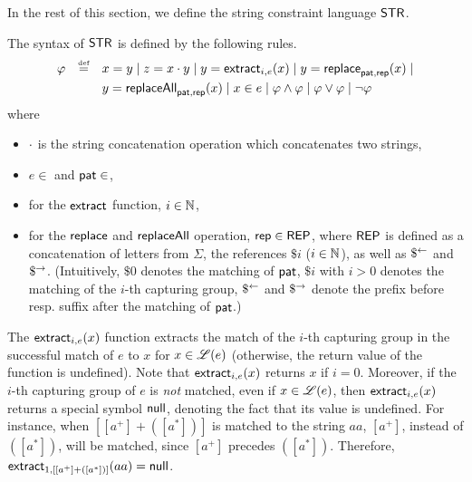 
In the rest of this section, we define the string constraint language $\mathsf{STR}$. 

The syntax of $\mathsf{STR}$ is defined by the following rules.
\[
\begin{array}{l c l}
\smallskip
\varphi & \eqdef  & x = y \mid z = x \concat y \mid y  = \extract_{i, e}(x) \mid
y  = \replace_{\pat, \rep}(x) \mid 
\\
& & y = \replaceall_{\pat, \rep}(x)   \mid
 x \in e \mid  \varphi \wedge \varphi \mid \varphi \vee \varphi \mid \neg \varphi \
\label{eq:SL}
\end{array}
\]
where
\begin{itemize}
	\item $\cdot$ is the string concatenation operation which concatenates two strings,
%
\item  $e \in${\regexp} and $\mathsf{pat} \in${\regexp},
%
\item for the $\mathsf{extract}$ function, $i \in \mathbb{N}$,
%
	\item  for the $\mathsf{replace}$ and $\mathsf{replaceAll}$ operation, $\mathsf{rep} \in {\sf REP}$, where ${\sf REP}$ is defined as a concatenation of letters from $\Sigma$, the references $\$i$ ($i \in \mathbb{N}$), as well as $\$^{\leftarrow}$ and $\$^{\rightarrow}$. (Intuitively, $\$0$ denotes the matching of $\mathsf{pat}$, $\$i$ with $i > 0$ denotes the matching of the $i$-th capturing group, $\$^{\leftarrow}$ and $\$^{\rightarrow}$ denote the prefix before resp. suffix after the matching of $\mathsf{pat}$.)
%
\end{itemize}

The $\mathsf{extract}_{i, e}(x)$ function extracts the match of the $i$-th capturing group in the successful match of $e$ to $x$ for $x \in \mathscr{L}(e)$ (otherwise, the return value of the function is undefined). Note that $\mathsf{extract}_{i, e}(x)$ returns $x$ if $i=0$. Moreover, if the $i$-th capturing group of $e$ is \emph{not} matched, even if $x \in \mathscr{L}(e)$, then $\mathsf{extract}_{i, e}(x)$ returns a special symbol $\mathsf{null}$, denoting the fact that its value is undefined. For instance, when $[[a^+] + ([a^*])]$ is matched to the string $aa$, $[a^+]$, instead of $([a^*])$, will be matched, since $[a^+]$ precedes $([a^*])$. Therefore, $\mathsf{extract}_{1, [[a^+] + ([a^*])]}(aa) = \mathsf{null}$. 

%


